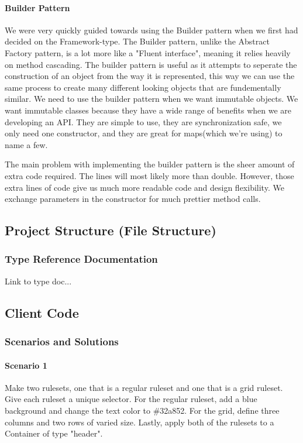 \documentclass[12pt]{article}
\begin{document}
        \paragraph{Builder Pattern}
        We were very quickly guided towards using the Builder pattern when we first had decided on the Framework-type. The Builder pattern, unlike the Abstract Factory pattern, is a lot more like a "Fluent interface", meaning it relies heavily on method cascading.
        The builder pattern is useful as it attempts to seperate the construction of an object from the way it is represented, this way we can use the same process to create many different looking objects that are fundementally similar.
        We need to use the builder pattern when we want immutable objects. We want immutable classes because they have a wide range of benefits when we are developing an API. They are simple to use, they are synchronization safe, we only need one constructor, and they are great for maps(which we're using) to name a few.

        The main problem with implementing the builder pattern is the sheer amount of extra code required. The lines will most likely more than double. However, those extra lines of code give us much more readable code and design flexibility. We exchange parameters in the constructor for much prettier method calls.

    \subsection{Project Structure (File Structure)}

        \subsubsection{Type Reference Documentation}
        Link to type doc...

    \subsection{Client Code}

        \subsubsection{Scenarios and Solutions}

        \paragraph{Scenario 1}
        Make two rulesets, one that is a regular ruleset and one that is a grid ruleset. Give each ruleset a unique selector. For the regular ruleset, add a blue background and change the text color to \#32a852. For the grid, define three columns and two rows of varied size. Lastly, apply both of the rulesets to a Container of type "header".
        
\end{document}
